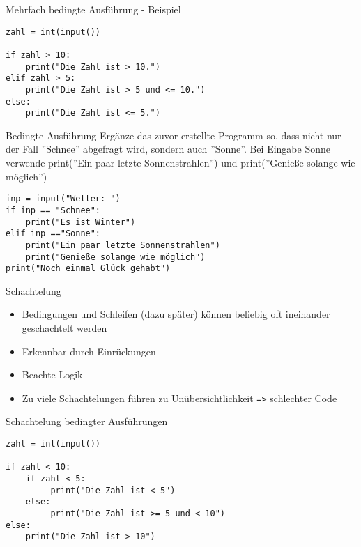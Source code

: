 \begin{frame}[fragile]{Mehrfach bedingte Ausführung - Beispiel}
\begin{lstlisting}
zahl = int(input())

if zahl > 10:
    print("Die Zahl ist > 10.")
elif zahl > 5:
    print("Die Zahl ist > 5 und <= 10.")
else:
    print("Die Zahl ist <= 5.")
\end{lstlisting}
\end{frame}


\begin{frame}[fragile]{Bedingte Ausführung}
Ergänze das zuvor erstellte Programm so, dass nicht nur der Fall ''Schnee'' abgefragt wird, sondern auch ''Sonne''. Bei Eingabe Sonne verwende print(''Ein paar letzte Sonnenstrahlen'') und  print(''Genieße solange wie möglich'')
\pause{}
\begin{lstlisting}
inp = input("Wetter: ")
if inp == "Schnee":
    print("Es ist Winter")
elif inp =="Sonne":
    print("Ein paar letzte Sonnenstrahlen")
    print("Genieße solange wie möglich")
print("Noch einmal Glück gehabt")
\end{lstlisting}
\end{frame} 


\begin{frame}[fragile]{Schachtelung}
\begin{itemize}
	\item Bedingungen und Schleifen (dazu später) können beliebig oft ineinander geschachtelt werden
	\item Erkennbar durch Einrückungen
	\item Beachte Logik
	\item Zu viele Schachtelungen führen zu Unübersichtlichkeit \texttt{=>} schlechter Code
\end{itemize}
\end{frame}


\begin{frame}[fragile]{Schachtelung bedingter Ausführungen}

\begin{lstlisting}
zahl = int(input())

if zahl < 10:
    if zahl < 5:
	     print("Die Zahl ist < 5")
	else:
		 print("Die Zahl ist >= 5 und < 10")
else:
	print("Die Zahl ist > 10")
\end{lstlisting}
\end{frame}


